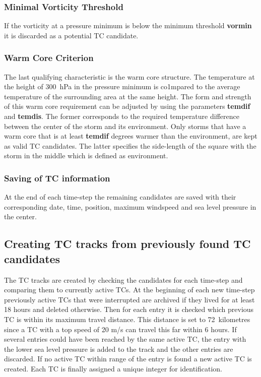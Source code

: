 \subsubsection*{Minimal Vorticity Threshold}
If the vorticity at a pressure minimum is below the minimum threshold
\textbf{vormin} it is discarded as a potential TC candidate.

\subsubsection*{Warm Core Criterion}
The last qualifying characteristic is the warm core structure. The temperature
at the height of 300~hPa in the pressure minimum is co1mpared to the average
temperature of the surrounding area at the same height. The form and strength
of this warm core requirement can be adjusted by using the parameters
\textbf{temdif} and \textbf{temdis}. The former corresponds to the required
temperature difference between the center of the storm and its environment.
Only storms that have a warm core that is at least \textbf{temdif} degrees
warmer than the environment, are kept as valid TC candidates. The latter
specifies the side-length of the square with the storm in the middle which is
defined as environment.
\subsubsection*{Saving of TC information}
At the end of each time-step the remaining candidates are saved with their
corresponding date, time, position, maximum windspeed and sea level pressure in
the center.

\subsection{Creating TC tracks from previously found TC candidates}
The TC tracks are created by checking the candidates for each time-step and
comparing them to currently active TCs. At the beginning of each new time-step
previously active TCs that were interrupted are archived if they lived for at
least 18 hours and deleted otherwise. Then for each entry it is checked which
previous TC is within its maximum travel distance. This distance is set to
72~kilometres since a TC with a top speed of 20 m/s can travel this far within
6 hours. If several entries could have been reached by the same active TC, the
entry with the lower sea level pressure is added to the track and the other
entries are discarded. If no active TC within range of the entry is found a new
active TC is created. Each TC is finally assigned a unique integer for
identification.

